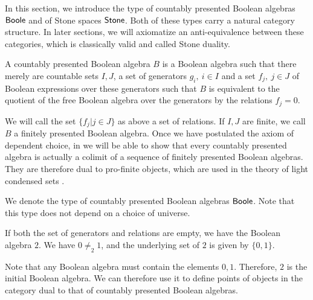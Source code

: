 In this section, we introduce the type of countably presented Boolean algebras $\mathsf{Boole}$ and of Stone spaces $\mathsf{Stone}$. 
Both of these types carry a natural category structure. 
In later sections, we will axiomatize an anti-equivalence between these categories, 
which is classically valid and called Stone duality. 


\begin{definition}
  A countably presented Boolean algebra $B$ is a Boolean algebra such that there merely are 
  countable sets $I,J$, 
  a set of generators $g_i,~{i\in I}$ and a set $f_j,~{j\in J}$ of Boolean expressions over these generators 
  such that $B$ is equivalent to the quotient of the free Boolean algebra over the generators by the relations
  $f_j=0$. 
\end{definition} 
We will call the set $\{f_j|j\in J\}$ as above a set of relations. 
If $I,J$ are finite, we call $B$ a finitely presented Boolean algebra. 
Once we have postulated the axiom of dependent choice, 
in 
we will be able to show that every countably presented algebra 
is actually a colimit of a sequence of finitely presented Boolean algebras.
They are therefore dual to pro-finite objects, which are used 
in the theory of light condensed sets \cite{Scholze,Dagur,TODO}.

\begin{remark}
  We denote the type of countably presented Boolean algebras $\mathsf{Boole}$. 
  Note that this type does not depend on a choice of universe. 
\end{remark}

\begin{example}
  If both the set of generators and relations are empty, we have the Boolean algebra $2$.
  We have $0\neq_2 1$, and the underlying set of $2$ is given by $\{0,1\}$.
\end{example}
Note that any Boolean algebra must contain the elements $0,1$. 
Therefore, $2$ is the initial Boolean algebra. 
We can therefore use it to define points of objects in the category dual to that of countably presented Boolean algebras. 

